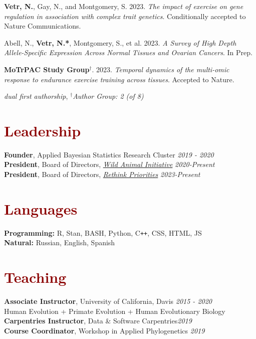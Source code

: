 \documentclass[11pt,margin,line]{resume}
\begin{document}
\begin{resume}
\textbf{Vetr, N.},  Gay,  N.,  and Montgomery,  S.  2023.  \emph{The impact of exercise on gene regulation in association with complex trait genetics}.  Conditionally accepted to Nature Communications.

Abell, N., \textbf{Vetr, N.*},  Montgomery, S., et al.  2023.  \emph{A Survey of High Depth Allele-Specific Expression Across Normal Tissues and Ovarian Cancers}.  In Prep.

\textbf{MoTrPAC Study Group}$^{\dag}$. 2023.  \emph{Temporal dynamics of the multi-omic response to endurance exercise training across tissues}.  Accepted to Nature. 

\vspace{-1.5mm}
{\hfill\small*\textit{dual first authorship}, $^{\dag}$\textit{Author Group: 2 (of 8)}}

\vspace{-1.5mm}
\section{\large\textcolor{DarkRed}{Leadership}}
\textbf{Founder}, Applied Bayesian Statistics Research Cluster \hfill \emph{2019 - 2020}\\
\textbf{President}, Board of Directors, \textit{\href{https://www.wildanimalinitiative.org/}{Wild Animal Initiative}} \hfill \emph{2020-Present}\\
\textbf{President}, Board of Directors, \textit{\href{https://rethinkpriorities.org/}{Rethink Priorities}} \hfill \emph{2023-Present}\\

\vspace{-5mm}
\section{\large\textcolor{DarkRed}{Languages}}
\textbf{Programming:} R, Stan, BASH, Python, C\texttt{++}, CSS, HTML, JS\\
\textbf{Natural:} Russian, English, Spanish

\vspace{-1.5mm}
\section{\large\textcolor{DarkRed}{Teaching}}
\textbf{Associate Instructor}, University of California, Davis \hfill \emph{2015  - 2020}
\\Human Evolution + Primate Evolution + Human Evolutionary Biology
\\\textbf{Carpentries Instructor}, Data \& Software Carpentries\hfill \emph{2019}
\\\textbf{Course Coordinator}, Workshop in Applied Phylogenetics \hfill \emph{2019}


\end{resume}
\end{document}
